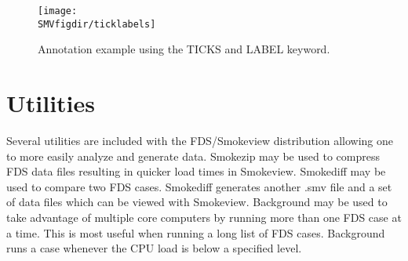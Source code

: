 \documentclass[11pt,twoside]{book}
\begin{document}
\begin{figure}[bph]
\begin{center}
\texttt{[image: \\SMVfigdir/ticklabels]}
\end{center}
\caption{ Annotation example using the TICKS and LABEL keyword. }
\label{figticklabelexample}%
\end{figure}


\chapter{Utilities}
Several utilities are included with the FDS/Smokeview distribution allowing one
to more easily analyze and generate data.  Smokezip may be used to compress
FDS data files resulting in quicker load times in Smokeview.  Smokediff may be used
to compare two FDS cases.  Smokediff generates another .smv file and a set of data files
which can be viewed with Smokeview.  Background may be used to take advantage of multiple
core computers by running more than one FDS case at a time.  This is most useful when running
a long list of FDS cases. Background runs a case whenever the CPU load is below a specified level.














%

\end{document}
